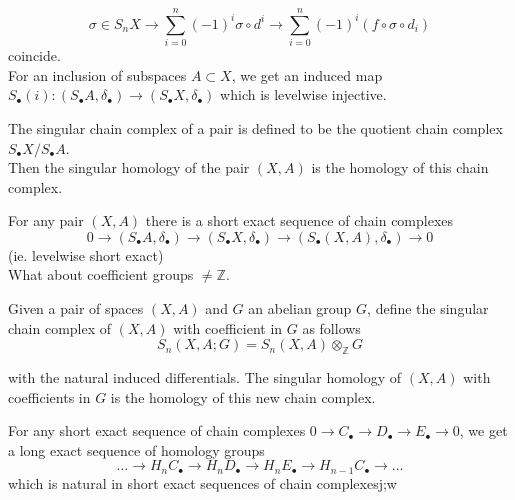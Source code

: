 \documentclass[../main.tex]{subfiles}
\begin{document}
\[ 
\sigma\in S_n X \to \sum_{i=0}^{ n}( -1)^{i}\sigma\circ d^{i}\to \sum_{i=0}^{ n} ( -1)^{i}( f\circ\sigma\circ d_i) 
\]
coincide.\\
For an inclusion of subspaces $A \subset X$, we get an induced map $S_\bullet( i) : ( S_\bullet A,\delta_\bullet) \to ( S_\bullet X, \delta_\bullet)$ which is levelwise injective.\\
\begin{defn}
	The singular chain complex of a pair is defined to be the quotient chain complex $S_\bullet X /S_\bullet A$.\\
	Then the singular homology of the pair $( X,A) $ is the homology of this chain complex.
\end{defn}
For any pair $( X,A) $ there is a short exact sequence of chain complexes
\[ 
0 \to ( S_\bullet A,\delta_\bullet) \to ( S_\bullet X,\delta_\bullet) \to ( S_\bullet( X,A) ,\delta_\bullet) \to 0
\]
(ie. levelwise short exact)\\
What about coefficient groups $\neq \mathbb{Z}$.\\
\begin{defn}
	Given a pair of spaces $( X,A) $ and $G$ an abelian group $G$, define the singular chain complex of $( X,A) $ with coefficient in $G$ as follows
	\[ 
	S_n( X,A; G) = S_n( X,A) \otimes_{\mathbb{Z}} G
	\]
	
with the natural induced differentials.
The singular homology of $( X,A) $ with coefficients in $G$ is the homology of this new chain complex.
\end{defn}
\begin{propo}
For any short exact sequence of chain complexes $0 \to C_\bullet \to D_\bullet \to E_\bullet \to 0$, we get a long exact sequence of homology groups
\[ 
\ldots \to H_n C_\bullet \to H_n D_\bullet \to H_n E_\bullet \to H_{n-1} C_\bullet \to  \ldots
\]
which is natural in short exact sequences of chain complexesj;w
\end{propo}
\end{document}
